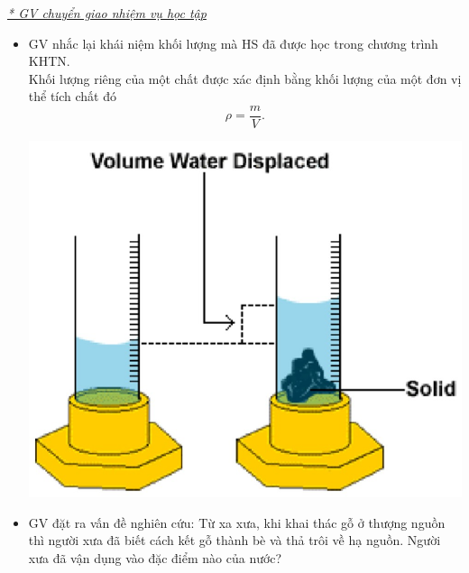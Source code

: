 {\textit{\underline{* GV chuyển giao nhiệm vụ học tập}}
	\begin{itemize}[label=-]
		\item GV nhắc lại khái niệm khối lượng mà HS đã được học trong chương trình KHTN.\\
		Khối lượng riêng của một chất được xác định bằng khối lượng của một đơn vị thể tích chất đó 
		$$\rho=\dfrac{m}{V}.$$
		\begin{center}
			\includegraphics[scale=0.5]{figs/G10-BAI11-12}
		\end{center}
		\item GV đặt ra vấn đề nghiên cứu: Từ xa xưa, khi khai thác gỗ ở thượng nguồn thì người xưa đã biết cách kết gỗ thành bè và thả trôi về hạ nguồn. Người xưa đã vận dụng vào đặc điểm nào của nước?
		\begin{center}

\end{center}
\end{itemize}}
